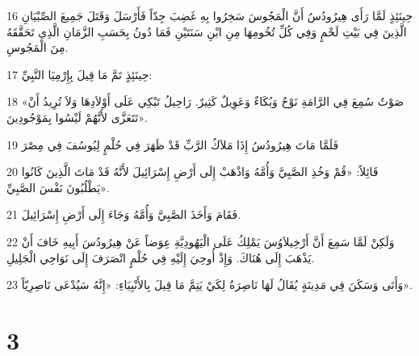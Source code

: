\par 16 حِينَئِذٍ لَمَّا رَأَى هِيرُودُسُ أَنَّ الْمَجُوسَ سَخِرُوا بِهِ غَضِبَ جِدّاً فَأَرْسَلَ وَقَتَلَ جَمِيعَ الصِّبْيَانِ الَّذِينَ فِي بَيْتِ لَحْمٍ وَفِي كُلِّ تُخُومِهَا مِنِ ابْنِ سَنَتَيْنِ فَمَا دُونُ بِحَسَبِ الزَّمَانِ الَّذِي تَحَقَّقَهُ مِنَ الْمَجُوسِ.
\par 17 حِينَئِذٍ تَمَّ مَا قِيلَ بِإِرْمِيَا النَّبِيِّ:
\par 18 «صَوْتٌ سُمِعَ فِي الرَّامَةِ نَوْحٌ وَبُكَاءٌ وَعَوِيلٌ كَثِيرٌ. رَاحِيلُ تَبْكِي عَلَى أَوْلاَدِهَا وَلاَ تُرِيدُ أَنْ تَتَعَزَّى لأَنَّهُمْ لَيْسُوا بِمَوْجُودِينَ».
\par 19 فَلَمَّا مَاتَ هِيرُودُسُ إِذَا مَلاَكُ الرَّبِّ قَدْ ظَهَرَ فِي حُلْمٍ لِيُوسُفَ فِي مِصْرَ
\par 20 قَائِلاً: «قُمْ وَخُذِ الصَّبِيَّ وَأُمَّهُ وَاذْهَبْ إِلَى أَرْضِ إِسْرَائِيلَ لأَنَّهُ قَدْ مَاتَ الَّذِينَ كَانُوا يَطْلُبُونَ نَفْسَ الصَّبِيِّ».
\par 21 فَقَامَ وَأَخَذَ الصَّبِيَّ وَأُمَّهُ وَجَاءَ إِلَى أَرْضِ إِسْرَائِيلَ.
\par 22 وَلَكِنْ لَمَّا سَمِعَ أَنَّ أَرْخِيلاَوُسَ يَمْلِكُ عَلَى الْيَهُودِيَّةِ عِوَضاً عَنْ هِيرُودُسَ أَبِيهِ خَافَ أَنْ يَذْهَبَ إِلَى هُنَاكَ. وَإِذْ أُوحِيَ إِلَيْهِ فِي حُلْمٍ انْصَرَفَ إِلَى نَوَاحِي الْجَلِيلِ.
\par 23 وَأَتَى وَسَكَنَ فِي مَدِينَةٍ يُقَالُ لَهَا نَاصِرَةُ لِكَيْ يَتِمَّ مَا قِيلَ بِالأَنْبِيَاءِ: «إِنَّهُ سَيُدْعَى نَاصِرِيّاً».

\chapter{3}

